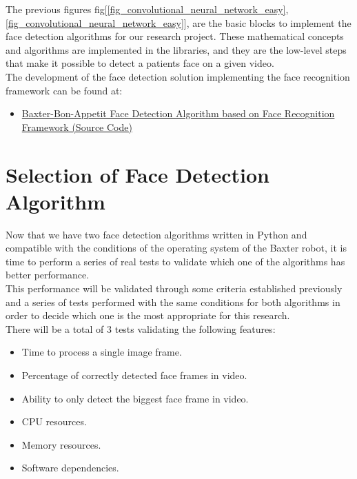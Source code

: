 \documentclass[11pt]{report} %
\begin{document}
The previous figures fig[\ref{fig_convolutional_neural_network_easy}, \ref{fig_convolutional_neural_network_easy}], are the basic blocks to implement the face detection algorithms for our research project. These mathematical concepts and algorithms are implemented in the libraries, and they are the low-level steps that make it possible to detect a patients face on a given video.\\

The development of the face detection solution implementing the face recognition framework can be found at:

\begin{itemize}
    \color{blue}
    \item \href{https://github.com/san99tiago/baxter-bon-appetit/tree/main/python/computer_vision/face_detect_face_recognition}{Baxter-Bon-Appetit Face Detection Algorithm based on Face Recognition Framework (Source Code)}
\end{itemize}


\section{Selection of Face Detection Algorithm}

Now that we have two face detection algorithms written in Python and compatible with the conditions of the operating system of the Baxter robot, it is time to perform a series of real tests to validate which one of the algorithms has better performance.\\

This performance will be validated through some criteria established previously and a series of tests performed with the same conditions for both algorithms in order to decide which one is the most appropriate for this research.\\

There will be a total of 3 tests validating the following features:

\begin{itemize}
    \item Time to process a single image frame.
    \item Percentage of correctly detected face frames in video.
    \item Ability to only detect the biggest face frame in video.
    \item CPU resources.
    \item Memory resources.
    \item Software dependencies.
\end{itemize}
\end{document}
